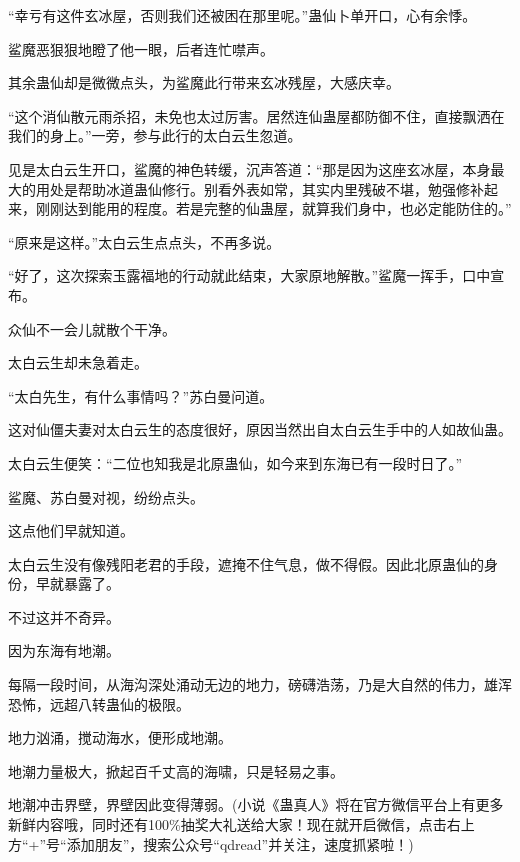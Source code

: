 \begin{this_body}
“幸亏有这件玄冰屋，否则我们还被困在那里呢。”蛊仙卜单开口，心有余悸。

鲨魔恶狠狠地瞪了他一眼，后者连忙噤声。

其余蛊仙却是微微点头，为鲨魔此行带来玄冰残屋，大感庆幸。

“这个消仙散元雨杀招，未免也太过厉害。居然连仙蛊屋都防御不住，直接飘洒在我们的身上。”一旁，参与此行的太白云生忽道。

见是太白云生开口，鲨魔的神色转缓，沉声答道：“那是因为这座玄冰屋，本身最大的用处是帮助冰道蛊仙修行。别看外表如常，其实内里残破不堪，勉强修补起来，刚刚达到能用的程度。若是完整的仙蛊屋，就算我们身中，也必定能防住的。”

“原来是这样。”太白云生点点头，不再多说。

“好了，这次探索玉露福地的行动就此结束，大家原地解散。”鲨魔一挥手，口中宣布。

众仙不一会儿就散个干净。

太白云生却未急着走。

“太白先生，有什么事情吗？”苏白曼问道。

这对仙僵夫妻对太白云生的态度很好，原因当然出自太白云生手中的人如故仙蛊。

太白云生便笑：“二位也知我是北原蛊仙，如今来到东海已有一段时日了。”

鲨魔、苏白曼对视，纷纷点头。

这点他们早就知道。

太白云生没有像残阳老君的手段，遮掩不住气息，做不得假。因此北原蛊仙的身份，早就暴露了。

不过这并不奇异。

因为东海有地潮。

每隔一段时间，从海沟深处涌动无边的地力，磅礴浩荡，乃是大自然的伟力，雄浑恐怖，远超八转蛊仙的极限。

地力汹涌，搅动海水，便形成地潮。

地潮力量极大，掀起百千丈高的海啸，只是轻易之事。

地潮冲击界壁，界壁因此变得薄弱。(小说《蛊真人》将在官方微信平台上有更多新鲜内容哦，同时还有100\%抽奖大礼送给大家！现在就开启微信，点击右上方“+”号“添加朋友”，搜索公众号“qdread”并关注，速度抓紧啦！)

\end{this_body}


